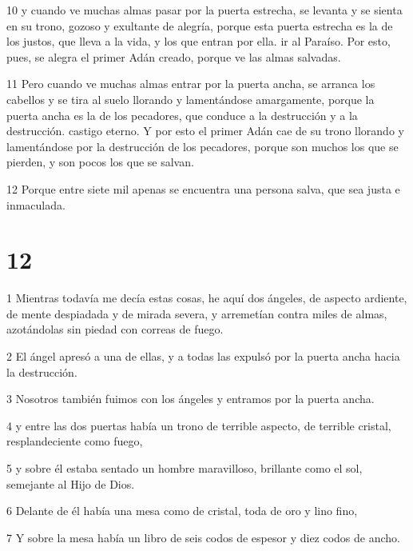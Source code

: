 \par 10 y cuando ve muchas almas pasar por la puerta estrecha, se levanta y se sienta en su trono, gozoso y exultante de alegría, porque esta puerta estrecha es la de los justos, que lleva a la vida, y los que entran por ella. ir al Paraíso. Por esto, pues, se alegra el primer Adán creado, porque ve las almas salvadas.

\par 11 Pero cuando ve muchas almas entrar por la puerta ancha, se arranca los cabellos y se tira al suelo llorando y lamentándose amargamente, porque la puerta ancha es la de los pecadores, que conduce a la destrucción y a la destrucción. castigo eterno. Y por esto el primer Adán cae de su trono llorando y lamentándose por la destrucción de los pecadores, porque son muchos los que se pierden, y son pocos los que se salvan.

\par 12 Porque entre siete mil apenas se encuentra una persona salva, que sea justa e inmaculada.

\chapter{12}

\par 1 Mientras todavía me decía estas cosas, he aquí dos ángeles, de aspecto ardiente, de mente despiadada y de mirada severa, y arremetían contra miles de almas, azotándolas sin piedad con correas de fuego.

\par 2 El ángel apresó a una de ellas, y a todas las expulsó por la puerta ancha hacia la destrucción.

\par 3 Nosotros también fuimos con los ángeles y entramos por la puerta ancha.

\par 4 y entre las dos puertas había un trono de terrible aspecto, de terrible cristal, resplandeciente como fuego,

\par 5 y sobre él estaba sentado un hombre maravilloso, brillante como el sol, semejante al Hijo de Dios.

\par 6 Delante de él había una mesa como de cristal, toda de oro y lino fino,

\par 7 Y sobre la mesa había un libro de seis codos de espesor y diez codos de ancho.

